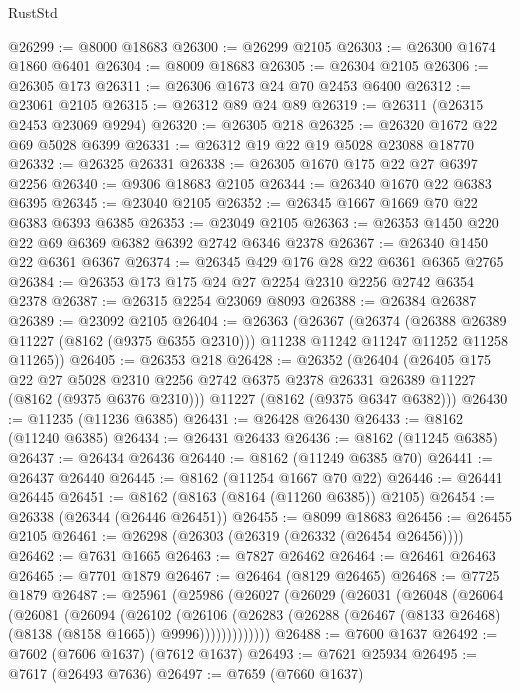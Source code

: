 \begin{lexlean}{RustStd}
\begin{coremodule}
@26299 := @8000 @18683
@26300 := @26299 @2105
@26303 := @26300 @1674 @1860 @6401
@26304 := @8009 @18683
@26305 := @26304 @2105
@26306 := @26305 @173
@26311 := @26306 @1673 @24 @70 @2453 @6400
@26312 := @23061 @2105
@26315 := @26312 @89 @24 @89
@26319 := @26311 (@26315 @2453 @23069 @9294)
@26320 := @26305 @218
@26325 := @26320 @1672 @22 @69 @5028 @6399
@26331 := @26312 @19 @22 @19 @5028 @23088 @18770
@26332 := @26325 @26331
@26338 := @26305 @1670 @175 @22 @27 @6397 @2256
@26340 := @9306 @18683 @2105
@26344 := @26340 @1670 @22 @6383 @6395
@26345 := @23040 @2105
@26352 := @26345 @1667 @1669 @70 @22 @6383 @6393 @6385
@26353 := @23049 @2105
@26363 := @26353 @1450 @220 @22 @69 @6369 @6382 @6392 @2742 @6346 @2378
@26367 := @26340 @1450 @22 @6361 @6367
@26374 := @26345 @429 @176 @28 @22 @6361 @6365 @2765
@26384 := @26353 @173 @175 @24 @27 @2254 @2310 @2256 @2742 @6354 @2378
@26387 := @26315 @2254 @23069 @8093
@26388 := @26384 @26387
@26389 := @23092 @2105
@26404 := @26363
    (@26367
      (@26374
        (@26388 @26389 @11227 (@8162 (@9375 @6355 @2310)))
        @11238
        @11242
        @11247
        @11252
        @11258
        @11265))
@26405 := @26353 @218
@26428 := @26352
    (@26404
      (@26405
        @175
        @22
        @27
        @5028
        @2310
        @2256
        @2742
        @6375
        @2378
        @26331
        @26389
        @11227
        (@8162 (@9375 @6376 @2310)))
      @11227
      (@8162 (@9375 @6347 @6382)))
@26430 := @11235 (@11236 @6385)
@26431 := @26428 @26430
@26433 := @8162 (@11240 @6385)
@26434 := @26431 @26433
@26436 := @8162 (@11245 @6385)
@26437 := @26434 @26436
@26440 := @8162 (@11249 @6385 @70)
@26441 := @26437 @26440
@26445 := @8162 (@11254 @1667 @70 @22)
@26446 := @26441 @26445
@26451 := @8162 (@8163 (@8164 (@11260 @6385)) @2105)
@26454 := @26338 (@26344 (@26446 @26451))
@26455 := @8099 @18683
@26456 := @26455 @2105
@26461 := @26298 (@26303 (@26319 (@26332 (@26454 @26456))))
@26462 := @7631 @1665
@26463 := @7827 @26462
@26464 := @26461 @26463
@26465 := @7701 @1879
@26467 := @26464 (@8129 @26465)
@26468 := @7725 @1879
@26487 := @25961
    (@25986
      (@26027
        (@26029
          (@26031
            (@26048
              (@26064
                (@26081
                  (@26094
                    (@26102
                      (@26106
                        (@26283
                          (@26288 (@26467 (@8133 @26468) (@8138 (@8158 @1665)) @9996)))))))))))))
@26488 := @7600 @1637
@26492 := @7602 (@7606 @1637) (@7612 @1637)
@26493 := @7621 @25934
@26495 := @7617 (@26493 @7636)
@26497 := @7659 (@7660 @1637)

\end{coremodule}
\end{lexlean}
